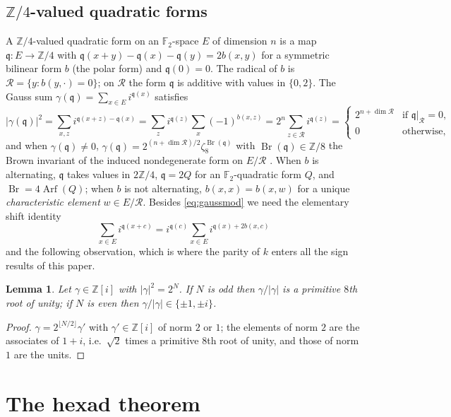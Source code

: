 \documentclass[12pt,a4paper]{amsart}
\newtheorem{lemma}[theorem]{Lemma}
\theoremstyle{definition}
\newcommand{\F}{\mathbb{F}}
\newcommand{\Z}{\mathbb{Z}}
\newcommand{\Arf}{\operatorname{Arf}}
\newcommand{\Br}{\operatorname{Br}}
\newcommand{\Rr}{\mathcal{R}}
\newcommand{\qq}{\mathfrak{q}}
\begin{document}
\subsection{\texorpdfstring{$\Z/4$}{Z/4}-valued quadratic forms}\label{subsec:Z4}
A $\Z/4$-valued quadratic form on an $\F_2$-space $E$ of dimension $n$ is a map $\qq:E\to\Z/4$ with $\qq(x+y)-\qq(x)-\qq(y)=2b(x,y)$ for a symmetric bilinear form $b$ (the polar form) and $\qq(0)=0$. The radical of $b$ is $\Rr=\{y:b(y,\cdot)=0\}$; on $\Rr$ the form $\qq$ is additive with values in $\{0,2\}$. The Gauss sum $\gamma(\qq)=\sum_{x\in E}i^{\qq(x)}$ satisfies
\begin{equation}\label{eq:gaussmod}
|\gamma(\qq)|^2=\sum_{x,z}i^{\qq(x+z)-\qq(x)}=\sum_zi^{\qq(z)}\sum_x(-1)^{b(x,z)}=2^n\sum_{z\in\Rr}i^{\qq(z)}=
\begin{cases}2^{n+\dim\Rr}&\text{if }\qq|_\Rr=0,\\0&\text{otherwise,}\end{cases}
\end{equation}
and when $\gamma(\qq)\ne0$, $\gamma(\qq)=2^{(n+\dim\Rr)/2}\zeta_8^{\Br(\qq)}$ with $\Br(\qq)\in\Z/8$ the Brown invariant of the induced nondegenerate form on $E/\Rr$ \cite{Brown}. When $b$ is alternating, $\qq$ takes values in $2\Z/4$, $\qq=2Q$ for an $\F_2$-quadratic form $Q$, and $\Br=4\Arf(Q)$; when $b$ is not alternating, $b(x,x)=b(x,w)$ for a unique \emph{characteristic element} $w\in E/\Rr$. Besides \eqref{eq:gaussmod} we need the elementary shift identity
\begin{equation}\label{eq:shift}
\sum_{x\in E}i^{\qq(x+c)}=i^{\qq(c)}\sum_{x\in E}i^{\qq(x)+2b(x,c)}
\end{equation}
and the following observation, which is where the parity of $k$ enters all the sign results of this paper.

\begin{lemma}\label{lem:oddgauss}
Let $\gamma\in\Z[i]$ with $|\gamma|^2=2^N$. If $N$ is odd then $\gamma/|\gamma|$ is a primitive $8$th root of unity; if $N$ is even then $\gamma/|\gamma|\in\{\pm1,\pm i\}$.
\end{lemma}
\begin{proof}
$\gamma=2^{\lfloor N/2\rfloor}\gamma'$ with $\gamma'\in\Z[i]$ of norm $2$ or $1$; the elements of norm $2$ are the associates of $1+i$, i.e.\ $\sqrt2$ times a primitive $8$th root of unity, and those of norm $1$ are the units.
\end{proof}

\section{The hexad theorem}\label{sec:hexad}
\end{document}
